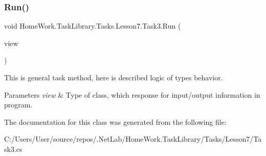 \subsubsection{\texorpdfstring{Run()}{Run()}}
{\footnotesize\ttfamily void Home\+Work.\+Task\+Library.\+Tasks.\+Lesson7.\+Task3.\+Run (\begin{DoxyParamCaption}\item[{I\+Information}]{view }\end{DoxyParamCaption})}



This is general task method, here is described logic of types behavior. 


\begin{DoxyParams}{Parameters}
{\em view} & Type of class, which response for input/output information in program.\\
\hline
\end{DoxyParams}


The documentation for this class was generated from the following file\+:\begin{DoxyCompactItemize}
\item 
C\+:/\+Users/\+User/source/repos/.\+Net\+Lab/\+Home\+Work.\+Task\+Library/\+Tasks/\+Lesson7/Task3.\+cs\end{DoxyCompactItemize}
